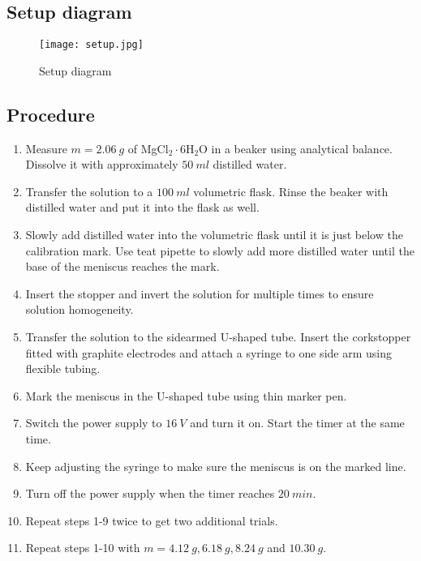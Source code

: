 \documentclass[a4paper]{article}
\begin{document}
\subsection{Setup diagram}

\begin{figure}[ht]
    \centering
    \texttt{[image: setup.jpg]}
    \caption{Setup diagram\protect\footnotemark[1] \label{this:figure}}
\end{figure}


\subsection{Procedure}

\begin{enumerate}
    \item Measure $m=\SI{2.06}{g}$ of MgCl${}_2\cdot 6$H${}_2$O in a beaker using analytical balance. Dissolve it with approximately $\SI{50}{ml}$ distilled water.
    \item Transfer the solution to a $\SI{100}{ml}$ volumetric flask. Rinse the beaker with distilled water and put it into the flask as well.
    \item Slowly add distilled water into the volumetric flask until it is just below the calibration mark. Use teat pipette to slowly add more distilled water until the base of the meniscus reaches the mark.
    \item Insert the stopper and invert the solution for multiple times to ensure solution homogeneity.
    \item Transfer the solution to the sidearmed U-shaped tube. Insert the corkstopper fitted with graphite electrodes and attach a syringe to one side arm using flexible tubing.
    \item Mark the meniscus in the U-shaped tube using thin marker pen.
    \item Switch the power supply to $\SI{16}{V}$ and turn it on. Start the timer at the same time.
    \item Keep adjusting the syringe to make sure the meniscus is on the marked line.
    \item Turn off the power supply when the timer reaches $\SI{20}{min}$.
    \item Repeat steps 1-9 twice to get two additional trials.
    \item Repeat steps 1-10 with $m=\SI{4.12}{g},\SI{6.18}{g},\SI{8.24}{g}$ and $\SI{10.30}{g}$.
\end{enumerate}
\end{document}

